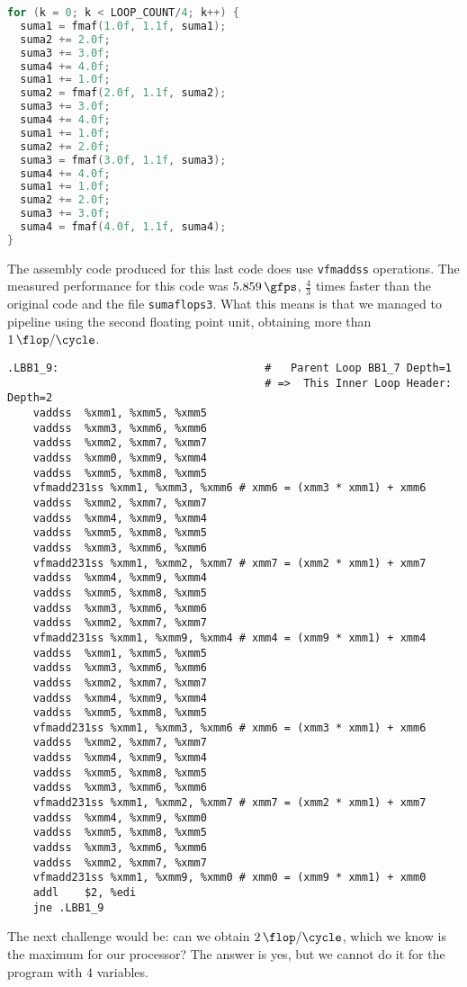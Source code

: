 \documentclass[
    12pt, %
]{fphw}
\newcommand{\tech}{\texttt}
\begin{document}
\begin{lstlisting}[language=C]
for (k = 0; k < LOOP_COUNT/4; k++) {
  suma1 = fmaf(1.0f, 1.1f, suma1);
  suma2 += 2.0f;
  suma3 += 3.0f;
  suma4 += 4.0f;
  suma1 += 1.0f;
  suma2 = fmaf(2.0f, 1.1f, suma2);
  suma3 += 3.0f;
  suma4 += 4.0f;
  suma1 += 1.0f;
  suma2 += 2.0f;
  suma3 = fmaf(3.0f, 1.1f, suma3);
  suma4 += 4.0f;
  suma1 += 1.0f;
  suma2 += 2.0f;
  suma3 += 3.0f;
  suma4 = fmaf(4.0f, 1.1f, suma4);
}
\end{lstlisting}

    The assembly code produced for this last code does use \tech{vfmaddss} operations.
The measured performance for this code was $\SI{5.859}{\gfps}$,
$\frac{4}{3}$ times faster than the original code and the file \tech{sumaflops3}.
What this means is that we managed to pipeline using the second floating point unit,
obtaining more than $\SI[per-mode=fraction]{1}{\flop\per\cycle}$.

\begin{lstlisting}
.LBB1_9:                                #   Parent Loop BB1_7 Depth=1
                                        # =>  This Inner Loop Header: Depth=2
	vaddss	%xmm1, %xmm5, %xmm5
	vaddss	%xmm3, %xmm6, %xmm6
	vaddss	%xmm2, %xmm7, %xmm7
	vaddss	%xmm0, %xmm9, %xmm4
	vaddss	%xmm5, %xmm8, %xmm5
	vfmadd231ss	%xmm1, %xmm3, %xmm6 # xmm6 = (xmm3 * xmm1) + xmm6
	vaddss	%xmm2, %xmm7, %xmm7
	vaddss	%xmm4, %xmm9, %xmm4
	vaddss	%xmm5, %xmm8, %xmm5
	vaddss	%xmm3, %xmm6, %xmm6
	vfmadd231ss	%xmm1, %xmm2, %xmm7 # xmm7 = (xmm2 * xmm1) + xmm7
	vaddss	%xmm4, %xmm9, %xmm4
	vaddss	%xmm5, %xmm8, %xmm5
	vaddss	%xmm3, %xmm6, %xmm6
	vaddss	%xmm2, %xmm7, %xmm7
	vfmadd231ss	%xmm1, %xmm9, %xmm4 # xmm4 = (xmm9 * xmm1) + xmm4
	vaddss	%xmm1, %xmm5, %xmm5
	vaddss	%xmm3, %xmm6, %xmm6
	vaddss	%xmm2, %xmm7, %xmm7
	vaddss	%xmm4, %xmm9, %xmm4
	vaddss	%xmm5, %xmm8, %xmm5
	vfmadd231ss	%xmm1, %xmm3, %xmm6 # xmm6 = (xmm3 * xmm1) + xmm6
	vaddss	%xmm2, %xmm7, %xmm7
	vaddss	%xmm4, %xmm9, %xmm4
	vaddss	%xmm5, %xmm8, %xmm5
	vaddss	%xmm3, %xmm6, %xmm6
	vfmadd231ss	%xmm1, %xmm2, %xmm7 # xmm7 = (xmm2 * xmm1) + xmm7
	vaddss	%xmm4, %xmm9, %xmm0
	vaddss	%xmm5, %xmm8, %xmm5
	vaddss	%xmm3, %xmm6, %xmm6
	vaddss	%xmm2, %xmm7, %xmm7
	vfmadd231ss	%xmm1, %xmm9, %xmm0 # xmm0 = (xmm9 * xmm1) + xmm0
	addl	$2, %edi
	jne	.LBB1_9
\end{lstlisting}

    The next challenge would be:
can we obtain $\SI[per-mode=fraction]{2}{\flop\per\cycle}$,
which we know is the maximum for our processor?
The answer is yes, but we cannot do it for the program with $4$ variables.
\end{document}
